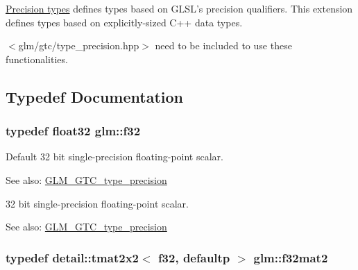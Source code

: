 \hyperlink{group__core__precision}{Precision types} defines types based on GLSL's precision qualifiers. This extension defines types based on explicitly-sized C++ data types.

$<$glm/gtc/type\_\-precision.hpp$>$ need to be included to use these functionalities. 

\subsection{Typedef Documentation}
\hypertarget{group__gtc__type__precision_g0ec999b57f5330d9021256e96038df04}{
\subsubsection[f32]{\setlength{\rightskip}{0pt plus 5cm}typedef float32 {\bf glm::f32}}}
\label{group__gtc__type__precision_g0ec999b57f5330d9021256e96038df04}


Default 32 bit single-precision floating-point scalar. \begin{Desc}
\item[See also:]\hyperlink{group__gtc__type__precision}{GLM\_\-GTC\_\-type\_\-precision}\end{Desc}
32 bit single-precision floating-point scalar. \begin{Desc}
\item[See also:]\hyperlink{group__gtc__type__precision}{GLM\_\-GTC\_\-type\_\-precision} \end{Desc}
\hypertarget{group__gtc__type__precision_g5a8b82f5ef3eb6355640d57466793d9b}{
\subsubsection[f32mat2]{\setlength{\rightskip}{0pt plus 5cm}typedef detail::tmat2x2$<$ f32, defaultp $>$ {\bf glm::f32mat2}}}
\label{group__gtc__type__precision_g5a8b82f5ef3eb6355640d57466793d9b}


